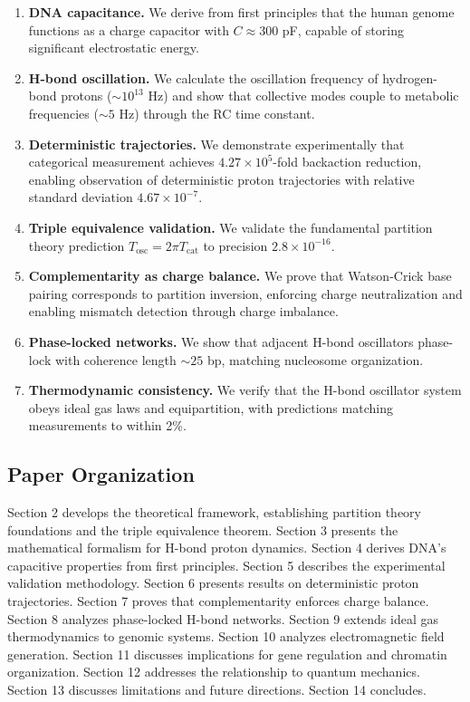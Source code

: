 \documentclass[twocolumn,10pt]{article}
\theoremstyle{remark}
\begin{document}
\begin{enumerate}
\item \textbf{DNA capacitance.} We derive from first principles that the human genome functions as a charge capacitor with $C \approx 300$ pF, capable of storing significant electrostatic energy.

\item \textbf{H-bond oscillation.} We calculate the oscillation frequency of hydrogen-bond protons ($\sim 10^{13}$ Hz) and show that collective modes couple to metabolic frequencies ($\sim 5$ Hz) through the RC time constant.

\item \textbf{Deterministic trajectories.} We demonstrate experimentally that categorical measurement achieves $4.27 \times 10^5$-fold backaction reduction, enabling observation of deterministic proton trajectories with relative standard deviation $4.67 \times 10^{-7}$.

\item \textbf{Triple equivalence validation.} We validate the fundamental partition theory prediction $T_{\mathrm{osc}} = 2\pi T_{\mathrm{cat}}$ to precision $2.8 \times 10^{-16}$.

\item \textbf{Complementarity as charge balance.} We prove that Watson-Crick base pairing corresponds to partition inversion, enforcing charge neutralization and enabling mismatch detection through charge imbalance.

\item \textbf{Phase-locked networks.} We show that adjacent H-bond oscillators phase-lock with coherence length $\sim 25$ bp, matching nucleosome organization.

\item \textbf{Thermodynamic consistency.} We verify that the H-bond oscillator system obeys ideal gas laws and equipartition, with predictions matching measurements to within 2\%.
\end{enumerate}

\subsection{Paper Organization}

Section 2 develops the theoretical framework, establishing partition theory foundations and the triple equivalence theorem. Section 3 presents the mathematical formalism for H-bond proton dynamics. Section 4 derives DNA's capacitive properties from first principles. Section 5 describes the experimental validation methodology. Section 6 presents results on deterministic proton trajectories. Section 7 proves that complementarity enforces charge balance. Section 8 analyzes phase-locked H-bond networks. Section 9 extends ideal gas thermodynamics to genomic systems. Section 10 analyzes electromagnetic field generation. Section 11 discusses implications for gene regulation and chromatin organization. Section 12 addresses the relationship to quantum mechanics. Section 13 discusses limitations and future directions. Section 14 concludes.
\end{document}

